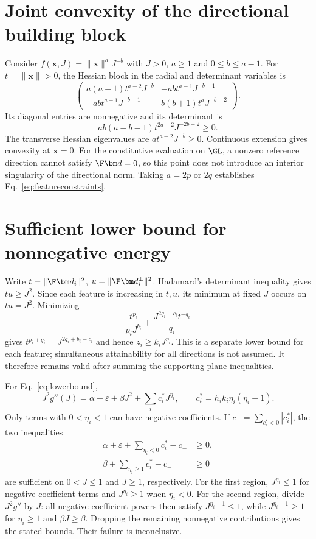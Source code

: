 \appendix
\section{Joint convexity of the directional building block}
\label{app:convex}
Consider $f(\bm x,J)=\|\bm x\|^aJ^{-b}$ with $J>0$, $a\geq1$ and $0\leq b\leq a-1$. For $t=\|\bm x\|>0$, the Hessian block in the radial and determinant variables is
\begin{equation}
 \begin{pmatrix}
 a(a-1)t^{a-2}J^{-b} & -ab t^{a-1}J^{-b-1}\\
 -ab t^{a-1}J^{-b-1} & b(b+1)t^aJ^{-b-2}
 \end{pmatrix}.
\end{equation}
Its diagonal entries are nonnegative and its determinant is
\begin{equation}
 ab(a-b-1)t^{2a-2}J^{-2b-2}\geq0.
\end{equation}
The transverse Hessian eigenvalues are $a t^{a-2}J^{-b}\geq0$. Continuous extension gives convexity at $\bm x=0$. For the constitutive evaluation on $\GL$, a nonzero reference direction cannot satisfy $\F\bm d=0$, so this point does not introduce an interior singularity of the directional norm. Taking $a=2p$ or $2q$ establishes Eq.~\eqref{eq:featureconstraints}.

\section{Sufficient lower bound for nonnegative energy}
\label{app:nonnegative}
Write $t=\|\F\bm d_i\|^2$, $u=\|\F\bm d_i^\perp\|^2$. Hadamard's determinant inequality gives $tu\geq J^2$. Since each feature is increasing in $t,u$, its minimum at fixed $J$ occurs on $tu=J^2$. Minimizing
\begin{equation}
 \frac{t^{p_i}}{p_iJ^{b_i}}+\frac{J^{2q_i-c_i}t^{-q_i}}{q_i}
\end{equation}
gives $t^{p_i+q_i}=J^{2q_i+b_i-c_i}$ and hence $z_i\geq k_iJ^{\eta_i}$. This is a separate lower bound for each feature; simultaneous attainability for all directions is not assumed. It therefore remains valid after summing the supporting-plane inequalities.

For Eq.~\eqref{eq:lowerbound},
\begin{equation}
 J^2g''(J)=\alpha+\varepsilon+\beta J^2+\sum_i c_i^*J^{\eta_i},
 \qquad c_i^*=h_i k_i\eta_i(\eta_i-1).
\end{equation}
Only terms with $0<\eta_i<1$ can have negative coefficients. If $c_-=\sum_{c_i^*<0}|c_i^*|$, the two inequalities
\begin{align}
 \alpha+\varepsilon+\sum_{\eta_i<0}c_i^*-c_-&\geq0,\\
 \beta+\sum_{\eta_i\geq1}c_i^*-c_-&\geq0
\end{align}
are sufficient on $0<J\leq1$ and $J\geq1$, respectively. For the first region, $J^{\eta_i}\leq1$ for negative-coefficient terms and $J^{\eta_i}\geq1$ when $\eta_i<0$. For the second region, divide $J^2g''$ by $J$: all negative-coefficient powers then satisfy $J^{\eta_i-1}\leq1$, while $J^{\eta_i-1}\geq1$ for $\eta_i\geq1$ and $\beta J\geq\beta$. Dropping the remaining nonnegative contributions gives the stated bounds. Their failure is inconclusive.

